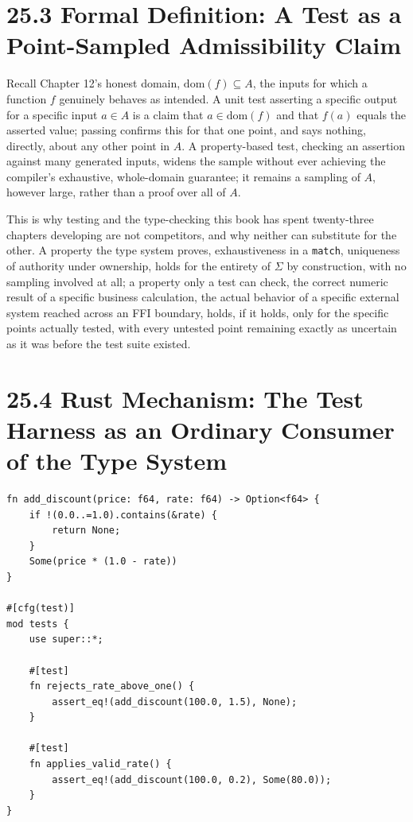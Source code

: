 \documentclass[11pt]{book}
\begin{document}
\section*{25.3 Formal Definition: A Test as a Point-Sampled Admissibility Claim}

Recall Chapter 12's honest domain, $\mathrm{dom}(f) \subseteq A$, the inputs for which a function $f$ genuinely behaves as intended. A unit test asserting a specific output for a specific input $a \in A$ is a claim that $a \in \mathrm{dom}(f)$ and that $f(a)$ equals the asserted value; passing confirms this for that one point, and says nothing, directly, about any other point in $A$. A property-based test, checking an assertion against many generated inputs, widens the sample without ever achieving the compiler's exhaustive, whole-domain guarantee; it remains a sampling of $A$, however large, rather than a proof over all of $A$.

This is why testing and the type-checking this book has spent twenty-three chapters developing are not competitors, and why neither can substitute for the other. A property the type system proves, exhaustiveness in a \texttt{match}, uniqueness of authority under ownership, holds for the entirety of $\Sigma$ by construction, with no sampling involved at all; a property only a test can check, the correct numeric result of a specific business calculation, the actual behavior of a specific external system reached across an FFI boundary, holds, if it holds, only for the specific points actually tested, with every untested point remaining exactly as uncertain as it was before the test suite existed.

\section*{25.4 Rust Mechanism: The Test Harness as an Ordinary Consumer of the Type System}

\begin{lstlisting}
fn add_discount(price: f64, rate: f64) -> Option<f64> {
    if !(0.0..=1.0).contains(&rate) {
        return None;
    }
    Some(price * (1.0 - rate))
}

#[cfg(test)]
mod tests {
    use super::*;

    #[test]
    fn rejects_rate_above_one() {
        assert_eq!(add_discount(100.0, 1.5), None);
    }

    #[test]
    fn applies_valid_rate() {
        assert_eq!(add_discount(100.0, 0.2), Some(80.0));
    }
}
\end{lstlisting}
\end{document}
